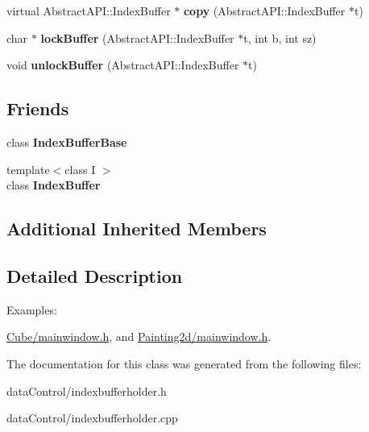 \begin{DoxyCompactItemize}
\item 
\hypertarget{class_tempest_1_1_index_buffer_holder_aad5532e23380d755662af7771d1ce3ff}{virtual Abstract\+A\+P\+I\+::\+Index\+Buffer $\ast$ {\bfseries copy} (Abstract\+A\+P\+I\+::\+Index\+Buffer $\ast$t)}\label{class_tempest_1_1_index_buffer_holder_aad5532e23380d755662af7771d1ce3ff}

\item 
\hypertarget{class_tempest_1_1_index_buffer_holder_aba7c1537f1bed08dd82fc98e228246c9}{char $\ast$ {\bfseries lock\+Buffer} (Abstract\+A\+P\+I\+::\+Index\+Buffer $\ast$t, int b, int sz)}\label{class_tempest_1_1_index_buffer_holder_aba7c1537f1bed08dd82fc98e228246c9}

\item 
\hypertarget{class_tempest_1_1_index_buffer_holder_a2ba8060265f44c644db586814363ea7d}{void {\bfseries unlock\+Buffer} (Abstract\+A\+P\+I\+::\+Index\+Buffer $\ast$t)}\label{class_tempest_1_1_index_buffer_holder_a2ba8060265f44c644db586814363ea7d}

\end{DoxyCompactItemize}
\subsection*{Friends}
\begin{DoxyCompactItemize}
\item 
\hypertarget{class_tempest_1_1_index_buffer_holder_a96a587d509460c7d76a779193a51afdc}{class {\bfseries Index\+Buffer\+Base}}\label{class_tempest_1_1_index_buffer_holder_a96a587d509460c7d76a779193a51afdc}

\item 
\hypertarget{class_tempest_1_1_index_buffer_holder_a391602b00b2303b580c0546f1d0e1c4e}{{\footnotesize template$<$class I $>$ }\\class {\bfseries Index\+Buffer}}\label{class_tempest_1_1_index_buffer_holder_a391602b00b2303b580c0546f1d0e1c4e}

\end{DoxyCompactItemize}
\subsection*{Additional Inherited Members}


\subsection{Detailed Description}
\begin{Desc}
\item[Examples\+: ]\par
\hyperlink{_cube_2mainwindow_8h-example}{Cube/mainwindow.\+h}, and \hyperlink{_painting2d_2mainwindow_8h-example}{Painting2d/mainwindow.\+h}.\end{Desc}


The documentation for this class was generated from the following files\+:\begin{DoxyCompactItemize}
\item 
data\+Control/indexbufferholder.\+h\item 
data\+Control/indexbufferholder.\+cpp\end{DoxyCompactItemize}
